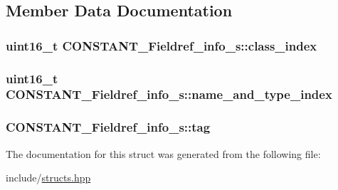\subsection{Member Data Documentation}
\hypertarget{structCONSTANT__Fieldref__info__s_a43b294af041ee1cdb3bc276d0d51ffb9}{
\subsubsection[{class\+\_\+index}]{\setlength{\rightskip}{0pt plus 5cm}uint16\+\_\+t C\+O\+N\+S\+T\+A\+N\+T\+\_\+\+Fieldref\+\_\+info\+\_\+s\+::class\+\_\+index}}\label{structCONSTANT__Fieldref__info__s_a43b294af041ee1cdb3bc276d0d51ffb9}
\hypertarget{structCONSTANT__Fieldref__info__s_a4577ca33395c8758c345b6e0a0fbc99b}{
\subsubsection[{name\+\_\+and\+\_\+type\+\_\+index}]{\setlength{\rightskip}{0pt plus 5cm}uint16\+\_\+t C\+O\+N\+S\+T\+A\+N\+T\+\_\+\+Fieldref\+\_\+info\+\_\+s\+::name\+\_\+and\+\_\+type\+\_\+index}}\label{structCONSTANT__Fieldref__info__s_a4577ca33395c8758c345b6e0a0fbc99b}
\hypertarget{structCONSTANT__Fieldref__info__s_a87c470bc8260141489d7bde228887b2a}{
\subsubsection[{tag}]{ C\+O\+N\+S\+T\+A\+N\+T\+\_\+\+Fieldref\+\_\+info\+\_\+s\+::tag}}\label{structCONSTANT__Fieldref__info__s_a87c470bc8260141489d7bde228887b2a}


The documentation for this struct was generated from the following file\+:\begin{DoxyCompactItemize}
\item 
include/\hyperlink{structs_8hpp}{structs.\+hpp}\end{DoxyCompactItemize}
